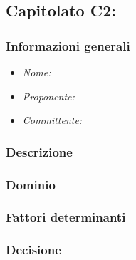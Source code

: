 \subsection{Capitolato C2: \textit{}}
\subsubsection{Informazioni generali}
\begin{itemize}
    \item \textit{Nome:}
    \item \textit{Proponente:}
    \item \textit{Committente:}
\end{itemize}
\subsubsection{Descrizione}
\subsubsection{Dominio}
\subsubsection{Fattori determinanti}
\subsubsection{Decisione}
